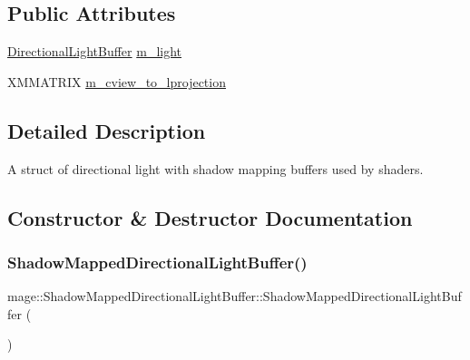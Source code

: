\subsection*{Public Attributes}
\begin{DoxyCompactItemize}
\item 
\hyperlink{structmage_1_1_directional_light_buffer}{Directional\+Light\+Buffer} \hyperlink{structmage_1_1_shadow_mapped_directional_light_buffer_a25d48ff3cbe28c78faa443000ba50e43}{m\+\_\+light}
\item 
X\+M\+M\+A\+T\+R\+IX \hyperlink{structmage_1_1_shadow_mapped_directional_light_buffer_a9f9eacd19ea436e00d63ae271c4e1c42}{m\+\_\+cview\+\_\+to\+\_\+lprojection}
\end{DoxyCompactItemize}


\subsection{Detailed Description}
A struct of directional light with shadow mapping buffers used by shaders. 

\subsection{Constructor \& Destructor Documentation}
\hypertarget{structmage_1_1_shadow_mapped_directional_light_buffer_a3375874624b392b0ecf4d88c25a9c82b}{}\label{structmage_1_1_shadow_mapped_directional_light_buffer_a3375874624b392b0ecf4d88c25a9c82b} 
\subsubsection{\texorpdfstring{Shadow\+Mapped\+Directional\+Light\+Buffer()}{ShadowMappedDirectionalLightBuffer()}\hspace{0.1cm}{\footnotesize\ttfamily [1/3]}}
{\footnotesize\ttfamily mage\+::\+Shadow\+Mapped\+Directional\+Light\+Buffer\+::\+Shadow\+Mapped\+Directional\+Light\+Buffer (\begin{DoxyParamCaption}{ }\end{DoxyParamCaption})\hspace{0.3cm}{\ttfamily [noexcept]}}

